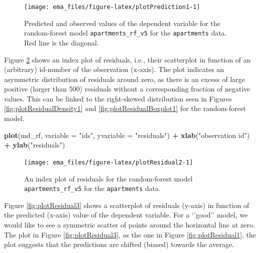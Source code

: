 \documentclass[]{krantz}
\newenvironment{Shaded}{\begin{snugshade}}{\end{snugshade}}
\newcommand{\DataTypeTok}[1]{\textcolor[rgb]{0.13,0.29,0.53}{#1}}
\newcommand{\KeywordTok}[1]{\textcolor[rgb]{0.13,0.29,0.53}{\textbf{#1}}}
\newcommand{\NormalTok}[1]{#1}
\newcommand{\OperatorTok}[1]{\textcolor[rgb]{0.81,0.36,0.00}{\textbf{#1}}}
\newcommand{\StringTok}[1]{\textcolor[rgb]{0.31,0.60,0.02}{#1}}
\begin{document}
\begin{figure}

{\centering \texttt{[image: ema\_files/figure-latex/plotPrediction1-1]} 

}

\caption{Predicted and observed values of the dependent variable for the random-forest model \texttt{apartments\_rf\_v5} for the \texttt{apartments} data. Red line is the diagonal.}\label{fig:plotPrediction1}
\end{figure}

Figure \ref{fig:plotResidual2} shows an index plot of residuals, i.e., their scatterplot in function of an (arbitrary) id-number of the observation (x-axis). The plot indicates an asymmetric distribution of residuals around zero, as there is an excess of large positive (larger than 500) residuals without a corresponding fraction of negative values. This can be linked to the right-skewed distribution seen in Figures \ref{fig:plotResidualDensity1} and \ref{fig:plotResidualBoxplot1} for the random-forest model.



\begin{Shaded}
\begin{Highlighting}[]
\KeywordTok{plot}\NormalTok{(md_rf, }\DataTypeTok{variable =} \StringTok{"ids"}\NormalTok{, }\DataTypeTok{yvariable =} \StringTok{"residuals"}\NormalTok{) }\OperatorTok{+}\StringTok{ }
\StringTok{    }\KeywordTok{xlab}\NormalTok{(}\StringTok{"observation id"}\NormalTok{) }\OperatorTok{+}\StringTok{ }\KeywordTok{ylab}\NormalTok{(}\StringTok{"residuals"}\NormalTok{)}
\end{Highlighting}
\end{Shaded}

\begin{figure}

{\centering \texttt{[image: ema\_files/figure-latex/plotResidual2-1]} 

}

\caption{An index plot of residuals for the random-forest model \texttt{apartments\_rf\_v5} for the \texttt{apartments} data.}\label{fig:plotResidual2}
\end{figure}

Figure \ref{fig:plotResidual3} shows a scatterplot of residuals (y-axis) in function of the predicted (x-axis) value of the dependent variable. For a `'good'' model, we would like to see a symmetric scatter of points around the horizontal line at zero. The plot in Figure \ref{fig:plotResidual3}, as the one in Figure \ref{fig:plotResidual1}, the plot suggests that the predictions are shifted (biased) towards the average.
\end{document}
